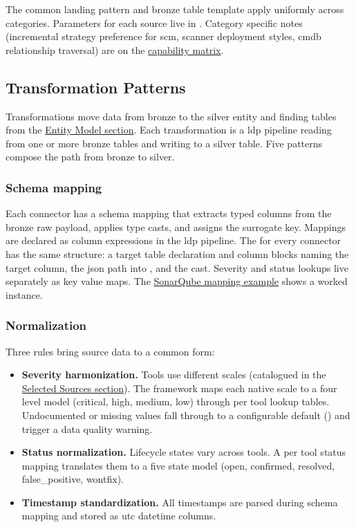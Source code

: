 The common landing pattern and bronze table template apply uniformly across categories. Parameters for each source live in . Category specific notes (incremental strategy preference for \gls{scm}, scanner deployment styles, \gls{cmdb} relationship traversal) are on the \href{https://vkraus.github.io/appsec-mvp/platform/reference/source-capability-matrix/}{capability matrix}.


\subsection{Transformation Patterns}
\label{sec:transformation-patterns}

Transformations move data from bronze to the silver entity and finding tables from the \hyperref[sec:entity-model]{Entity Model section}. Each transformation is a \gls{ldp} pipeline reading from one or more bronze tables and writing to a silver table. Five patterns compose the path from bronze to silver.

\subsubsection{Schema mapping}

Each connector has a schema mapping that extracts typed columns from the bronze raw payload, applies type casts, and assigns the surrogate key. Mappings are declared as column expressions in the \gls{ldp} pipeline. The  for every connector has the same structure: a target table declaration and column blocks naming the target column, the \gls{json} path into , and the cast. Severity and status lookups live separately as key value maps. The \href{https://vkraus.github.io/appsec-mvp/connectors/sast/sonarqube/\#mapping-example}{SonarQube mapping example} shows a worked instance.

\subsubsection{Normalization}

Three rules bring source data to a common form:

\begin{itemize}
    \item \textbf{Severity harmonization.} Tools use different scales (catalogued in the \hyperref[sec:selected-sources]{Selected Sources section}). The framework maps each native scale to a four level model (critical, high, medium, low) through per tool lookup tables. Undocumented or missing values fall through to a configurable default () and trigger a data quality warning.
    \item \textbf{Status normalization.} Lifecycle states vary across tools. A per tool status mapping translates them to a five state model (open, confirmed, resolved, false\_positive, wontfix).
    \item \textbf{Timestamp standardization.} All timestamps are parsed during schema mapping and stored as \gls{utc} datetime columns.
\end{itemize}

